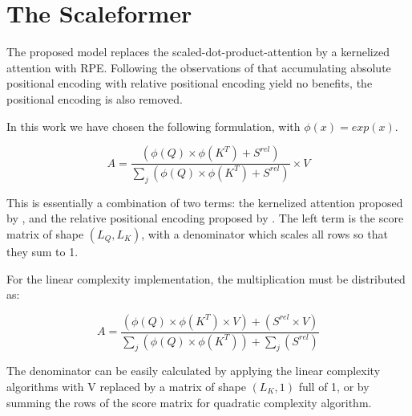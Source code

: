 \section{The Scaleformer}

The proposed model replaces the scaled-dot-product-attention by a
kernelized attention with RPE. Following the observations of
\citet{shaw2018selfattention} that
accumulating absolute positional encoding with relative positional
encoding yield no benefits, the positional encoding is also removed.

In this work we have chosen the following formulation, with $\phi(x) = exp(x)$.

\begin{equation}
A = \frac{\left( \phi(Q) \times \phi(K^T) + S^{rel} \right)}{\sum_j \left( \phi(Q) \times \phi(K^T) + S^{rel} \right)} \times V
\end{equation}

This is essentially a combination of two terms: the kernelized attention
proposed by  \citet{katharopoulos2020transformers}, and the relative positional encoding proposed by
\citet{shaw2018selfattention}. The left
term is the score matrix of shape $(L_Q, L_K)$, with a denominator
which scales all rows so that they sum to 1.

For the linear complexity implementation, the multiplication must be distributed as:

\begin{equation}
A = \frac{\left( \phi(Q) \times \phi(K^T) \times V \right) + \left( S^{rel} \times V\right)}{\sum_j \left( \phi(Q) \times \phi(K^T) \right) + \sum_j \left( S^{rel} \right)}
\end{equation}

The denominator can be easily calculated by applying the linear complexity algorithms with V replaced by a matrix of shape $(L_K, 1)$ full of 1, or by summing the rows of the score matrix for quadratic complexity algorithm.

\endinput
